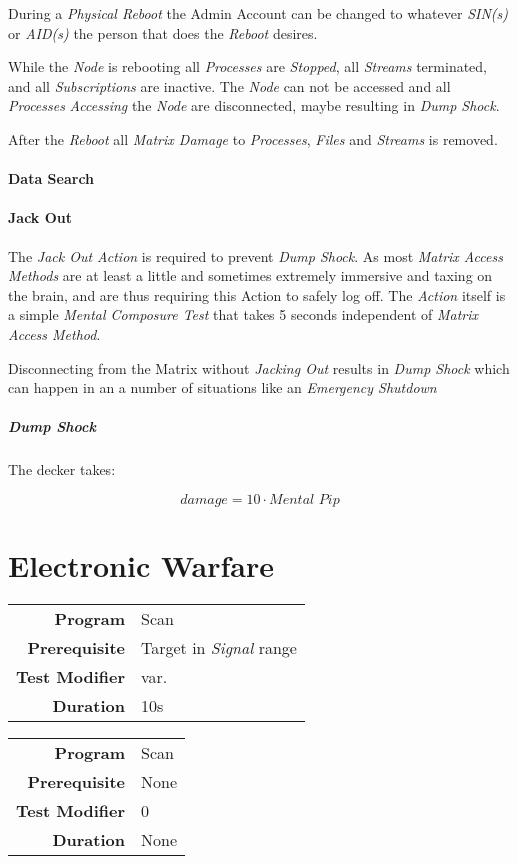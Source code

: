 During a \emph{Physical Reboot} the Admin Account can be changed to whatever
\emph{SIN(s)} or \emph{AID(s)} the person that does the \emph{Reboot} desires.

While the \emph{Node} is rebooting all \emph{Processes} are \emph{Stopped}, all
\emph{Streams} terminated, and all \emph{Subscriptions} are inactive. The
\emph{Node} can not be accessed and all \emph{Processes} \emph{Accessing} the
\emph{Node} are disconnected, maybe resulting in \emph{Dump Shock}.


After the \emph{Reboot} all \emph{Matrix Damage} to \emph{Processes}, \emph{Files}
and \emph{Streams} is removed.

\paragraph{Data Search}

\paragraph{Jack Out}

The \emph{Jack Out Action} is required to prevent \emph{Dump Shock}. As most
\emph{Matrix Access Methods} are at least a little and sometimes extremely
immersive and taxing on the brain, and are thus requiring this Action to safely
log off. The \emph{Action} itself is a simple \emph{Mental Composure Test} that
takes 5 seconds independent of \emph{Matrix Access Method}.

Disconnecting from the Matrix without \emph{Jacking Out} results in
\emph{Dump Shock} which can happen in an a number of situations like an
\emph{Emergency Shutdown}


\subparagraph{Dump Shock}

The decker takes:

\begin{equation}
    \textit{damage} = 10 \cdot \textit{Mental Pip}
\end{equation}

\section{Electronic Warfare}

\label{par:find wireless}


\begin{tabular}{rl}
    \textbf{Program}       & Scan                          \\
    \textbf{Prerequisite}  & Target in \emph{Signal} range \\
    \textbf{Test Modifier} & var.                          \\
    \textbf{Duration}      & 10s                           \\
\end{tabular}

\hfill

\label{par:jam wireless}


\begin{tabular}{rl}
    \textbf{Program}       & Scan \\
    \textbf{Prerequisite}  & None \\
    \textbf{Test Modifier} & 0    \\
    \textbf{Duration}      & None \\
\end{tabular}

\hfill
